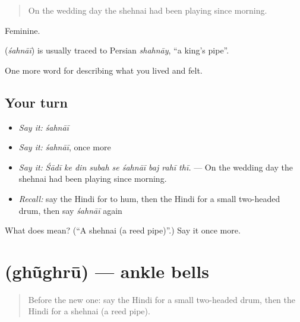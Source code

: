 \begin{quote}
On the wedding day the shehnai had been playing since morning.
\end{quote}

Feminine.

\begin{cousinweb}
\textbf{} (\emph{śahnāī}) is usually traced to Persian \emph{shahnāy}, \textquotedblleft{}a king's pipe\textquotedblright{}.
\end{cousinweb}

\begin{grammarlens}[title={What you've built}]
One more word for describing what you lived and felt.
\end{grammarlens}

\subsection*{Your turn}
\begin{itemize}
\raggedright
  \item \emph{Say it:} \emph{śahnāī}
  \item \emph{Say it:} \emph{śahnāī}, once more
  \item \emph{Say it:} \emph{Śādī ke din subah se śahnāī baj rahī thī.} — On the wedding day the shehnai had been playing since morning.
  \item \emph{Recall:} say the Hindi for to hum, then the Hindi for a small two-headed drum, then say \emph{śahnāī} again
\end{itemize}

\begin{tcolorbox}[breakable,colback=teal!4,colframe=teal!35!black,title={Before you move on}]
What does  mean? (\textquotedblleft{}A shehnai (a reed pipe)\textquotedblright{}.) Say it once more.
\end{tcolorbox}
\section[\texorpdfstring{\hi{घुँघरू} (ghũghrū)}{घुँघरू (ghũghrū)}]{ (ghũghrū) — ankle bells}

\label{lesson:HI-C531-ghughru}



\begin{quote}
Before the new one: say the Hindi for a small two-headed drum, then the Hindi for a shehnai (a reed pipe).
\end{quote}

